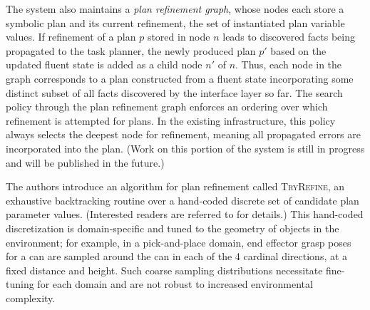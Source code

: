 The system also maintains a \emph{plan refinement graph}, whose nodes each store a symbolic plan and
its current refinement, the set of instantiated plan variable values. If refinement of a plan $p$ stored in node
$n$ leads to discovered facts being propagated to the task planner, the newly produced plan $p'$ based on
the updated fluent state is added as a child node $n'$ of $n$. Thus, each node in the graph corresponds to a
plan constructed from a fluent state incorporating some distinct subset of all facts
discovered by the interface layer so far. The search policy through the plan refinement graph
enforces an ordering over which refinement is attempted for plans. In the existing infrastructure, this policy
always selects the deepest node for refinement, meaning all propagated errors are incorporated into the plan.
(Work on this portion of the system is still in progress and will be published in the future.)

The authors introduce an algorithm for plan refinement
called \textsc{TryRefine}, an exhaustive backtracking routine over a hand-coded discrete set of candidate
plan parameter values. (Interested readers are referred to \cite{srivastava2014combined} for details.)
This hand-coded discretization is domain-specific and tuned to the geometry of objects in the
environment; for example, in a pick-and-place domain, end effector grasp poses for a can are
sampled around the can in each of the 4 cardinal directions, at a fixed distance and height.
Such coarse sampling distributions necessitate fine-tuning for each domain and are not robust to
increased environmental complexity.

